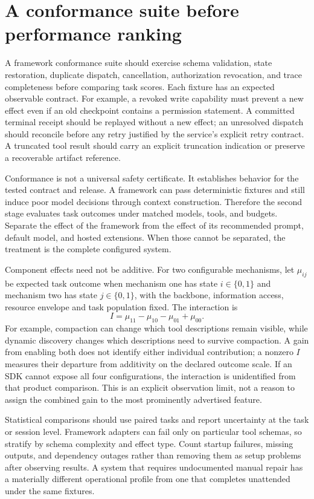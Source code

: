 \section{A conformance suite before performance ranking}\label{sec:C22:conformance}
A framework conformance suite should exercise schema validation, state restoration, duplicate dispatch, cancellation, authorization revocation, and trace completeness before comparing task scores. Each fixture has an expected observable contract. For example, a revoked write capability must prevent a new effect even if an old checkpoint contains a permission statement. A committed terminal receipt should be replayed without a new effect; an unresolved dispatch should reconcile before any retry justified by the service's explicit retry contract. A truncated tool result should carry an explicit truncation indication or preserve a recoverable artifact reference.

Conformance is not a universal safety certificate. It establishes behavior for the tested contract and release. A framework can pass deterministic fixtures and still induce poor model decisions through context construction. Therefore the second stage evaluates task outcomes under matched models, tools, and budgets. Separate the effect of the framework from the effect of its recommended prompt, default model, and hosted extensions. When those cannot be separated, the treatment is the complete configured system.

Component effects need not be additive. For two configurable mechanisms, let $\mu_{ij}$ be expected task outcome when mechanism one has state $i\in\{0,1\}$ and mechanism two has state $j\in\{0,1\}$, with the backbone, information access, resource envelope and task population fixed. The interaction is
\begin{equation}
 I=\mu_{11}-\mu_{10}-\mu_{01}+\mu_{00}.
\end{equation}
For example, compaction can change which tool descriptions remain visible, while dynamic discovery changes which descriptions need to survive compaction. A gain from enabling both does not identify either individual contribution; a nonzero $I$ measures their departure from additivity on the declared outcome scale. If an SDK cannot expose all four configurations, the interaction is unidentified from that product comparison. This is an explicit observation limit, not a reason to assign the combined gain to the most prominently advertised feature.

Statistical comparisons should use paired tasks and report uncertainty at the task or session level. Framework adapters can fail only on particular tool schemas, so stratify by schema complexity and effect type. Count startup failures, missing outputs, and dependency outages rather than removing them as setup problems after observing results. A system that requires undocumented manual repair has a materially different operational profile from one that completes unattended under the same fixtures.

